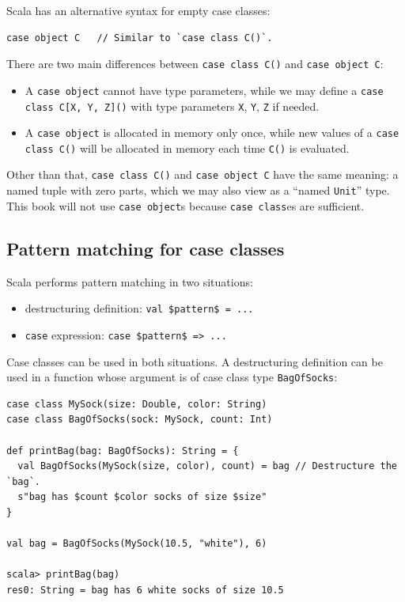 Scala has an alternative syntax for empty case classes:
\begin{lstlisting}
case object C   // Similar to `case class C()`.
\end{lstlisting}
There are two main differences between \lstinline!case class C()!
and \lstinline!case object C!:
\begin{itemize}
\item A \lstinline!case object! cannot have type parameters, while we may
define a \lstinline!case class C[X, Y, Z]()! with type parameters
\lstinline!X!, \lstinline!Y!, \lstinline!Z! if needed.
\item A \lstinline!case object! is allocated in memory only once, while
new values of a \lstinline!case class C()! will be allocated in memory
each time \lstinline!C()! is evaluated.
\end{itemize}
Other than that, \lstinline!case class C()! and \lstinline!case object C!
have the same meaning: a named tuple with zero parts, which we may
also view as a ``named \lstinline!Unit!''
type. This book will not use \lstinline!case object!s because \lstinline!case class!es
are sufficient.

\subsection{Pattern matching for case classes}

Scala performs pattern matching in two situations:
\begin{itemize}
\item destructuring definition: \lstinline[mathescape=true]!val $pattern$ = ...!
\item \lstinline!case! expression: \lstinline[mathescape=true]!case $pattern$ => ...!
\end{itemize}
Case classes can be used in both situations. A destructuring definition
can be used in a function whose argument is of case class type \lstinline!BagOfSocks!:
\begin{lstlisting}
case class MySock(size: Double, color: String)
case class BagOfSocks(sock: MySock, count: Int)

def printBag(bag: BagOfSocks): String = {
  val BagOfSocks(MySock(size, color), count) = bag // Destructure the `bag`.
  s"bag has $count $color socks of size $size"
}

val bag = BagOfSocks(MySock(10.5, "white"), 6)

scala> printBag(bag)
res0: String = bag has 6 white socks of size 10.5
\end{lstlisting}

